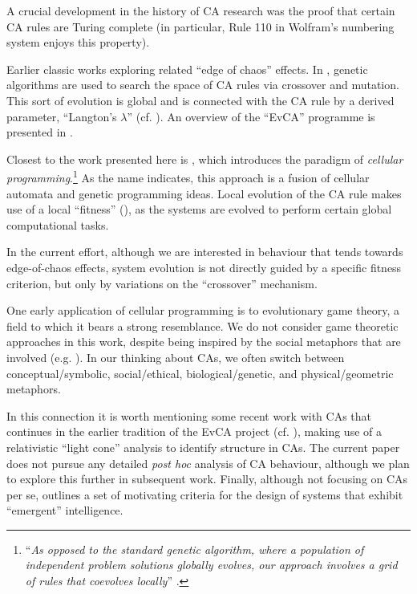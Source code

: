 A crucial development in the history of CA research was the proof
\cite{cook2004universality} that certain CA rules are Turing complete
(in particular, Rule 110 in Wolfram's numbering system
\cite{wolfram1994cellular} enjoys this property).

Earlier classic works
\cite{langton1990computation,mitchell1993revisiting,packard1988adaptation}
exploring related ``edge of chaos'' effects.  In
\cite{packard1988adaptation,mitchell1993revisiting,mitchell1994evolving},
genetic algorithms are used to search the space of CA rules via
crossover and mutation.  This sort of evolution is global and is
connected with the CA rule by a derived parameter, ``Langton's
$\lambda$'' (cf. \cite{langton1990computation}).  An overview of the
``EvCA'' programme is presented in \cite{hordijk2013evca}.

Closest to the work presented here is \cite{sipper1997evolution},
which introduces the paradigm of \emph{cellular
  programming}.\footnote{``\emph{As opposed to the standard genetic
    algorithm, where a population of independent problem solutions
    globally evolves, our approach involves a grid of rules that
    coevolves locally}'' \cite[p. 74]{sipper1997evolution}.}  As the
name indicates, this approach is a fusion of cellular automata and
genetic programming ideas.  Local evolution of the CA rule makes use
of a local ``fitness'' (\cite[pp. 79--81]{sipper1997evolution}), as
the systems are evolved to perform certain global computational tasks.

In the current effort, although we are interested in behaviour that
tends towards edge-of-chaos effects, system evolution is not directly
guided by a specific fitness criterion, but only by variations on the
``crossover'' mechanism.

One early application of cellular programming is to evolutionary game
theory, a field to which it bears a strong resemblance.  We do not
consider game theoretic approaches in this work, despite being
inspired by the social metaphors that are involved
(e.g. \cite{nowak1992evolutionary,nowak2006five}).  In our thinking
about CAs, we often switch between conceptual/symbolic,
social/ethical, biological/genetic, and physical/geometric metaphors.

In this connection it is worth mentioning some recent work with CAs
\cite{goerg2012licors,goerg2012mixed} that continues in the earlier
tradition of the EvCA project (cf. \cite{hordijk2001upper}), making
use of a relativistic ``light cone'' analysis to identify structure in
CAs.  The current paper does not pursue any detailed \emph{post hoc}
analysis of CA behaviour, although we plan to explore this further in
subsequent work.  Finally, although not focusing on CAs per se,
\cite{hofstadter1995prolegomena} outlines a set of motivating criteria
for the design of systems that exhibit ``emergent'' intelligence.



